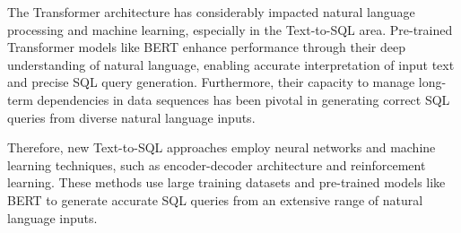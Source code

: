 The Transformer architecture \cite{https://doi.org/10.48550/arxiv.1706.03762} has considerably impacted natural language processing and machine learning, especially in the Text-to-SQL area. Pre-trained Transformer models like BERT enhance performance through their deep understanding of natural language, enabling accurate interpretation of input text and precise SQL query generation. Furthermore, their capacity to manage long-term dependencies in data sequences has been pivotal in generating correct SQL queries from diverse natural language inputs.

Therefore, new Text-to-SQL approaches employ neural networks and machine learning techniques, such as encoder-decoder architecture and reinforcement learning. These methods use large training datasets and pre-trained models like BERT to generate accurate SQL queries from an extensive range of natural language inputs.